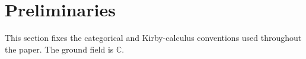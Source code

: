 \section{Preliminaries}
\label{sec:preliminaries}

This section fixes the categorical and Kirby-calculus conventions used
throughout the paper.  The ground field is $\mathbb C$.




